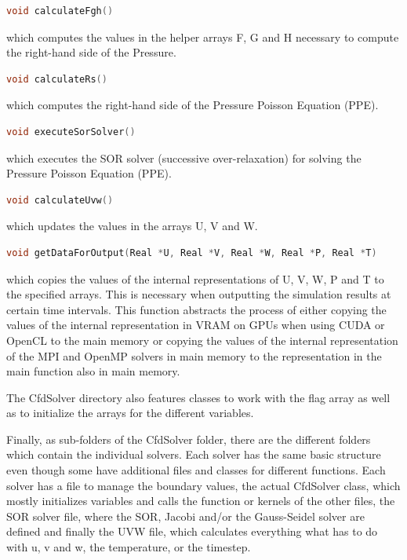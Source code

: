 \documentclass{article}%
\begin{document}
\begin{lstlisting}[language=C++,frame=single]
void calculateFgh()
\end{lstlisting}
which computes the values in the helper arrays F, G and H necessary to compute the right-hand side of the Pressure.

\begin{lstlisting}[language=C++,frame=single]
void calculateRs()
\end{lstlisting}
which computes the right-hand side of the Pressure Poisson Equation (PPE).

\begin{lstlisting}[language=C++,frame=single]
void executeSorSolver()
\end{lstlisting}
which executes the SOR solver (successive over-relaxation) for solving the Pressure Poisson Equation (PPE).

\begin{lstlisting}[language=C++,frame=single]
void calculateUvw()
\end{lstlisting}
which updates the values in the arrays U, V and W.

\begin{lstlisting}[language=C++,frame=single]
void getDataForOutput(Real *U, Real *V, Real *W, Real *P, Real *T)
\end{lstlisting}
which copies the values of the internal representations of U, V, W, P and T to the specified arrays. This is necessary when outputting the simulation results at certain time intervals. This function abstracts the process of either copying the values of the internal representation in VRAM on GPUs when using CUDA or OpenCL to the main memory or copying the values of the internal representation of the MPI and OpenMP solvers in main memory to the representation in the main function also in main memory.

The CfdSolver directory also features classes to work with the flag array as well as to initialize the arrays for the different variables.

Finally, as sub-folders of the CfdSolver folder, there are the different folders which contain the individual solvers. Each solver has the same basic structure even though some have additional files and classes for different functions. Each solver has a file to manage the boundary values, the actual CfdSolver class, which mostly initializes variables and calls the function or kernels of the other files, the SOR solver file, where the SOR, Jacobi and/or the Gauss-Seidel solver are defined and finally the UVW file, which calculates everything what has to do with u, v and w, the temperature, or the timestep.
\end{document}

